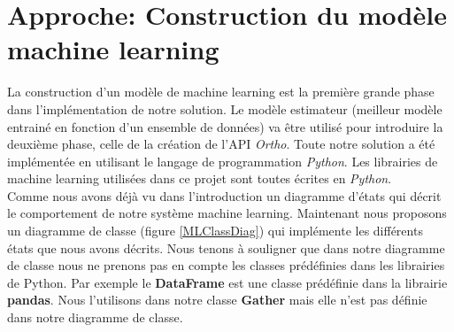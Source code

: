 \documentclass[12pt, french]{report}
\begin{document}
 




%
%
%
%
%



\newpage

\chapter{Approche: Construction du modèle machine learning} \label{chap:modelml}

La construction d'un modèle de machine learning est la première grande phase dans l'implémentation de notre solution. Le modèle estimateur (meilleur modèle entrainé en fonction d'un ensemble de données) va être utilisé pour introduire la deuxième phase, celle de la création de l'API \textit{Ortho}. Toute notre solution a été implémentée en utilisant le langage de programmation \textit{Python}. Les librairies de machine learning utilisées dans ce projet sont toutes écrites en \textit{Python}.\\

Comme nous avons déjà vu dans l'introduction un diagramme d'états qui décrit le comportement de notre système machine learning. Maintenant nous proposons un diagramme de classe (figure \ref{MLClassDiag}) qui implémente les différents états que nous avons décrits. Nous tenons à souligner que dans notre diagramme de classe nous ne prenons pas en compte les classes prédéfinies dans les librairies de Python. Par exemple le \textbf{DataFrame} est une classe prédéfinie dans la librairie \textbf{pandas}. Nous l'utilisons dans notre classe \textbf{Gather} mais elle n'est pas définie dans notre diagramme de classe.  \\ 
\end{document}
